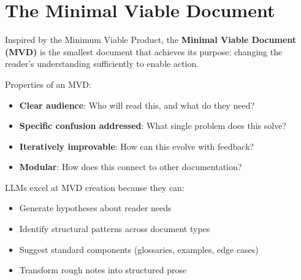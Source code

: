 \chapter{The Minimal Viable Document}

Inspired by the Minimum Viable Product, the \textbf{Minimal Viable Document (MVD)} is the smallest document that achieves its purpose: changing the reader's understanding sufficiently to enable action.

Properties of an MVD:

\begin{itemize}
    \item \textbf{Clear audience}: Who will read this, and what do they need?
    \item \textbf{Specific confusion addressed}: What single problem does this solve?
    \item \textbf{Iteratively improvable}: How can this evolve with feedback?
    \item \textbf{Modular}: How does this connect to other documentation?
\end{itemize}

LLMs excel at MVD creation because they can:

\begin{itemize}
    \item Generate hypotheses about reader needs
    \item Identify structural patterns across document types
    \item Suggest standard components (glossaries, examples, edge cases)
    \item Transform rough notes into structured prose
\end{itemize}
